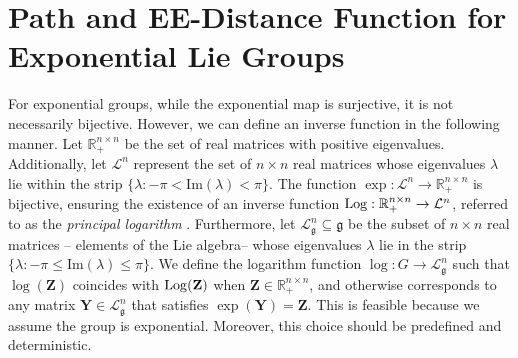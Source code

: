 \section{Path and EE-Distance Function for Exponential Lie Groups}\label{sec:kinematic-path-ee-dist-exp-group} %
For exponential groups, while the exponential map is surjective, it is not necessarily bijective. However, we can define an inverse function in the following manner. Let $\mathbb{R}_+^{n\times n}$ be the set of real matrices with positive eigenvalues. Additionally, let $\mathcal{L}^n$ represent the set of $n\times n$ real matrices whose eigenvalues $\lambda$ lie within the strip $\{\lambda : -\pi < \text{Im}(\lambda) < \pi\}$. The function $\exp:\mathcal{L}^n\to\mathbb{R}_+^{n\times n}$ is bijective, ensuring the existence of an inverse function $\operatorname{Log}: \mathbb{R}_+^{n\times n} \to \mathcal{L}^n$, referred to as the \emph{principal logarithm} \citep[p. 319]{Gallier2020}. Furthermore, let $\mathcal{L}_{\mathfrak{g}}^n\subseteq\mathfrak{g}$ be the subset of $n \times n$ real matrices -- elements of the Lie algebra-- whose eigenvalues $\lambda$ lie in the strip $\{\lambda : -\pi \le \text{Im}(\lambda) \le \pi\}$. We define the logarithm function $\log:G\to\mathcal{L}_{\mathfrak{g}}^n$ such that $\log(\mathbf{Z})$ coincides with $\operatorname{Log}(\mathbf{Z})$ when $\mathbf{Z}\in\mathbb{R}_+^{n\times n}$, and otherwise corresponds to any matrix $\mathbf{Y}\in\mathcal{L}_{\mathfrak{g}}^n$ that satisfies $\exp(\mathbf{Y}) = \mathbf{Z}$. This is feasible because we assume the group is exponential. Moreover, this choice should be predefined and deterministic.

